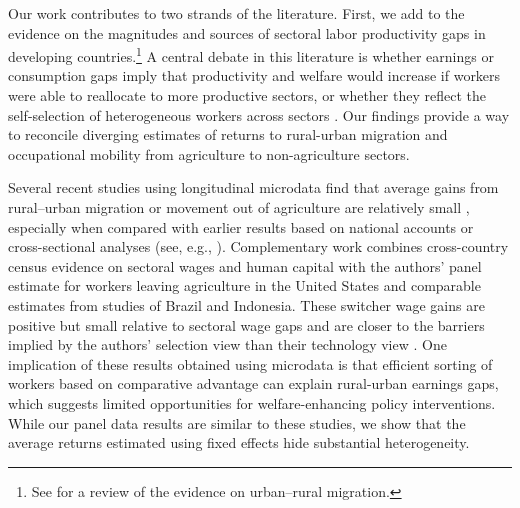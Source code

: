 \documentclass[12pt]{article}
\begin{document}

Our work contributes to two strands of the literature. 
First, we add to the evidence on the magnitudes and sources of sectoral labor productivity gaps in developing countries.\footnote{See \cite{lagakosUrbanRuralGapsDeveloping2020a} for a review of the evidence on urban--rural migration.}
A central debate in this literature is whether earnings or consumption gaps imply that productivity and welfare would increase if workers were able to reallocate to more productive sectors, or whether they reflect the self-selection of heterogeneous workers across sectors \citep{donovanRoleLaborMarket2023}.
Our findings provide a way to reconcile diverging estimates of returns to rural-urban migration and occupational mobility from agriculture to non-agriculture sectors.

Several recent studies using longitudinal microdata find that average gains from rural--urban migration or movement out of agriculture are relatively small \citep{alvarezAgriculturalWageGap2020,hamoryReevaluatingAgriculturalProductivity2021}, especially when compared with earlier results based on national accounts or cross-sectional analyses (see, e.g., \citealt{gollinAgriculturalProductivityGap2014,youngInequalityUrbanRuralGap2013}).
Complementary work combines cross-country census evidence on sectoral wages and human capital with the authors' panel estimate for workers leaving agriculture in the United States and comparable estimates from studies of Brazil and Indonesia. These switcher wage gains are positive but small relative to sectoral wage gaps and are closer to the barriers implied by the authors' selection view than their technology view \citep{herrendorfWagesHumanCapital2018}.
One implication of these results obtained using microdata is that efficient sorting of workers based on comparative advantage can explain rural-urban earnings gaps, which suggests limited opportunities for welfare-enhancing policy interventions. 
While our panel data results are similar to these studies, we show that the average returns estimated using fixed effects hide substantial heterogeneity.
\end{document}
